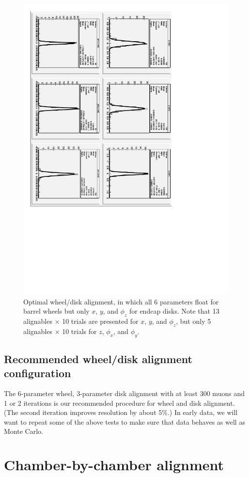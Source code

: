 \documentclass[12pt]{article}
\begin{document}
\begin{figure}
\includegraphics[height=\linewidth, angle=90]{disk_alignment/alldt_3csc.pdf}

\caption{\label{alldt_3csc} Optimal wheel/disk alignment, in which all
  6 parameters float for barrel wheels but only $x$, $y$, and $\phi_z$
  for endcap disks.  Note that 13 alignables $\times$ 10 trials are
  presented for $x$, $y$, and $\phi_z$, but only 5 alignables $\times$
  10 trials for $z$, $\phi_x$, and $\phi_y$.}
\end{figure}

\subsection{Recommended wheel/disk alignment configuration}

The 6-parameter wheel, 3-parameter disk alignment with at least 300
muons and 1 or 2 iterations is our recommended procedure for wheel and
disk alignment.  (The second iteration improves resolution by about
5\%.)  In early data, we will want to repeat some of the above tests
to make sure that data behaves as well as Monte Carlo.

\section{Chamber-by-chamber alignment}
\end{document}
